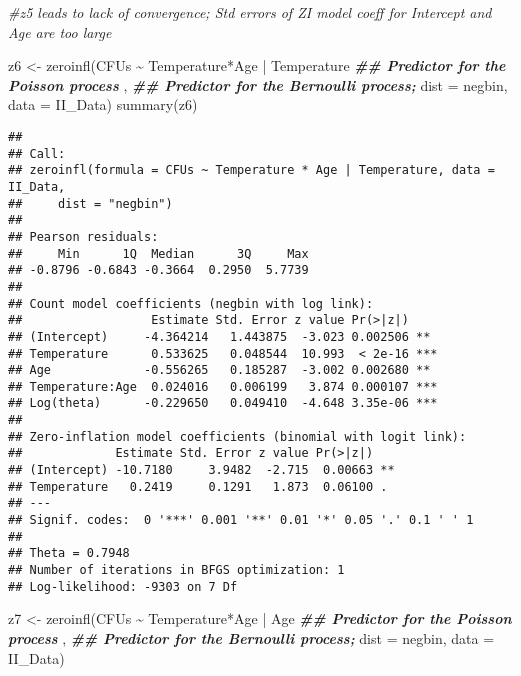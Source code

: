 \documentclass[
]{article}
\newenvironment{Shaded}{\begin{snugshade}}{\end{snugshade}}
\newcommand{\AttributeTok}[1]{\textcolor[rgb]{0.77,0.63,0.00}{#1}}
\newcommand{\CommentTok}[1]{\textcolor[rgb]{0.56,0.35,0.01}{\textit{#1}}}
\newcommand{\DocumentationTok}[1]{\textcolor[rgb]{0.56,0.35,0.01}{\textbf{\textit{#1}}}}
\newcommand{\FunctionTok}[1]{\textcolor[rgb]{0.00,0.00,0.00}{#1}}
\newcommand{\NormalTok}[1]{#1}
\newcommand{\OtherTok}[1]{\textcolor[rgb]{0.56,0.35,0.01}{#1}}
\newcommand{\SpecialCharTok}[1]{\textcolor[rgb]{0.00,0.00,0.00}{#1}}
\newcommand{\StringTok}[1]{\textcolor[rgb]{0.31,0.60,0.02}{#1}}
\begin{document}
\begin{Shaded}
\begin{Highlighting}[]
\CommentTok{\#z5 leads to lack of convergence; Std errors of ZI model  coeff for Intercept and Age are too large}

\NormalTok{z6 }\OtherTok{\textless{}{-}} \FunctionTok{zeroinfl}\NormalTok{(CFUs }\SpecialCharTok{\textasciitilde{}}\NormalTok{ Temperature}\SpecialCharTok{*}\NormalTok{Age }\SpecialCharTok{|}\NormalTok{ Temperature }\DocumentationTok{\#\# Predictor for the Poisson process}
\NormalTok{               , }\DocumentationTok{\#\# Predictor for the Bernoulli process;}
               \AttributeTok{dist =} \StringTok{\textquotesingle{}negbin\textquotesingle{}}\NormalTok{,}
               \AttributeTok{data =}\NormalTok{ II\_Data)}
\FunctionTok{summary}\NormalTok{(z6)}
\end{Highlighting}
\end{Shaded}

\begin{verbatim}
## 
## Call:
## zeroinfl(formula = CFUs ~ Temperature * Age | Temperature, data = II_Data, 
##     dist = "negbin")
## 
## Pearson residuals:
##     Min      1Q  Median      3Q     Max 
## -0.8796 -0.6843 -0.3664  0.2950  5.7739 
## 
## Count model coefficients (negbin with log link):
##                  Estimate Std. Error z value Pr(>|z|)    
## (Intercept)     -4.364214   1.443875  -3.023 0.002506 ** 
## Temperature      0.533625   0.048544  10.993  < 2e-16 ***
## Age             -0.556265   0.185287  -3.002 0.002680 ** 
## Temperature:Age  0.024016   0.006199   3.874 0.000107 ***
## Log(theta)      -0.229650   0.049410  -4.648 3.35e-06 ***
## 
## Zero-inflation model coefficients (binomial with logit link):
##             Estimate Std. Error z value Pr(>|z|)   
## (Intercept) -10.7180     3.9482  -2.715  0.00663 **
## Temperature   0.2419     0.1291   1.873  0.06100 . 
## ---
## Signif. codes:  0 '***' 0.001 '**' 0.01 '*' 0.05 '.' 0.1 ' ' 1 
## 
## Theta = 0.7948 
## Number of iterations in BFGS optimization: 1 
## Log-likelihood: -9303 on 7 Df
\end{verbatim}

\begin{Shaded}
\begin{Highlighting}[]
\NormalTok{z7 }\OtherTok{\textless{}{-}} \FunctionTok{zeroinfl}\NormalTok{(CFUs }\SpecialCharTok{\textasciitilde{}}\NormalTok{ Temperature}\SpecialCharTok{*}\NormalTok{Age }\SpecialCharTok{|}\NormalTok{ Age }\DocumentationTok{\#\# Predictor for the Poisson process}
\NormalTok{               , }\DocumentationTok{\#\# Predictor for the Bernoulli process;}
               \AttributeTok{dist =} \StringTok{\textquotesingle{}negbin\textquotesingle{}}\NormalTok{,}
               \AttributeTok{data =}\NormalTok{ II\_Data)}
\end{Highlighting}
\end{Shaded}
\end{document}
